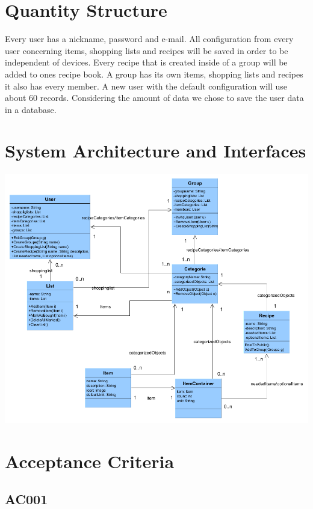 \documentclass[12pt]{article}
\theoremstyle{definition}
\begin{document}
\section{Quantity Structure}

Every user has a nickname, password and e-mail. All configuration from every user concerning items, shopping lists and recipes will be saved in order to be independent of devices. Every recipe that is created inside of a group will be added to ones recipe book. A group has its own items, shopping lists and recipes it also has every member. A new user with the default configuration will use about 60 records. Considering the amount of data we chose to save the user data in a database. 

\pagebreak

\section{System Architecture and Interfaces}

\includegraphics[scale=.5]{UMLClassDiagram.png}

\pagebreak

\section{Acceptance Criteria}

\subsection{AC001}
\end{document}
